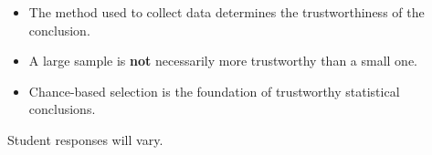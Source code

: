 \documentclass[10pt]{article}
\begin{document}
\vspace{0.14in}

\begin{tcolorbox}[colback=greenbg, colframe=greenacc, boxrule=0.8pt, arc=2mm,
    left=4mm, right=4mm, top=3mm, bottom=3mm]
    \small
    \begin{itemize}[leftmargin=1.3em, itemsep=8pt]
  \item The method used to collect data determines the trustworthiness of the conclusion.
  \item A large sample is \textbf{not} necessarily more trustworthy than a small one.
  \item Chance-based selection is the foundation of trustworthy statistical conclusions.
    \end{itemize}
\end{tcolorbox}

\vspace{0.2in}

\noindent\textcolor{slate}{\small Student responses will vary.}
\end{document}
